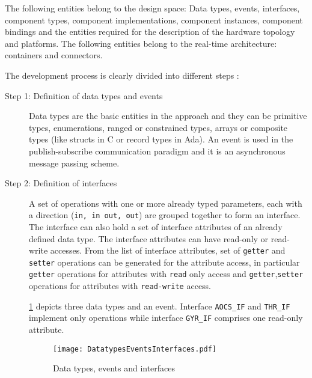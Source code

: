 The following entities belong to the design space: Data types, events, interfaces, component types, component implementations, component instances, component bindings and the entities required for the description of the hardware topology and platforms. The following entities belong to the real-time architecture: containers and connectors.

The development process is clearly divided into different steps \cite{CompBasedProcess, PhdThesis,SAVOIR}:

\begin{description}
\item [Step 1: Definition of data types and events] Data types are the basic entities in the approach and they can be primitive types, enumerations, ranged or constrained types, arrays or composite types (like structs in C or record types in Ada). An event is used in the publish-subscribe communication paradigm and it is an asynchronous message passing scheme. 

\item [Step 2: Definition of interfaces] A set of operations with one or more already typed parameters, each with a direction (\texttt{in, in out, out}) are grouped together to form an interface. The interface can also hold a set of interface attributes of an already defined data type. The interface attributes can have read-only or read-write accesses. From the list of interface attributes, set of \texttt{getter} and \texttt{setter} operations can be generated for the attribute access, in particular \texttt{getter} operations for attributes with \texttt{read} only access and \texttt{getter},\texttt{setter} operations for attributes with \texttt{read-write} access. 

\cref{fig: Datatypes events and interfaces} depicts three data types and an event. Interface \texttt{AOCS\_IF} and \texttt{THR\_IF} implement only operations while interface \texttt{GYR\_IF} comprises one read-only attribute.

\begin{figure}[h]
	\centering
	\texttt{[image: DatatypesEventsInterfaces.pdf]}
	\caption{Data types, events and interfaces}
	\label{fig: Datatypes events and interfaces}
\end{figure}


\end{description}
